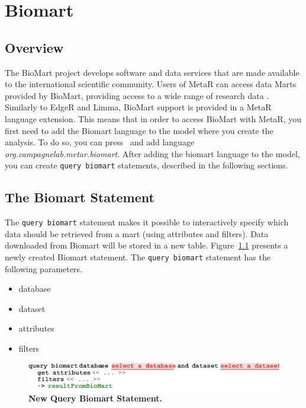 

\chapter{Biomart}\label{chap:Biomart}

\section{Overview}
The BioMart project develops software and data services that are made available to the international scientific community. Users of MetaR can access data Marts provided by BioMart, providing access to a wide range of research data . Similarly to EdgeR and Limma, BioMart support is provided in a MetaR language extension. This means that in order to access BioMart with MetaR, you first need to add the Biomart language to the model where you create the analysis. To do so, you can press~ and add language \textit{org\allowbreak.campagnelab\allowbreak.metar\allowbreak.biomart}. After adding the biomart language to the model, you can create \texttt{query biomart} statements, described in the following sections. 

\section{The Biomart Statement}
The \texttt{query biomart} statement makes it possible to interactively specify which data should be retrieved from a mart (using attributes and filters). Data downloaded from Biomart will be stored in a new table. Figure~\ref{fig:NewBiomart} presents a newly created Biomart statement.
The \texttt{query biomart} statement has the following parameters.
\begin{itemize}
\item database
\item dataset
\item attributes
\item filters
\end{itemize} 

 \begin{figure}[h!tbp]
  \centering
  \includegraphics[width=\figWidthWide]{figures/NewBiomart.pdf}
\caption[New Query Biomart Statement.]{\textbf{New Query Biomart Statement.}}
\label{fig:NewBiomart}
\end{figure}


